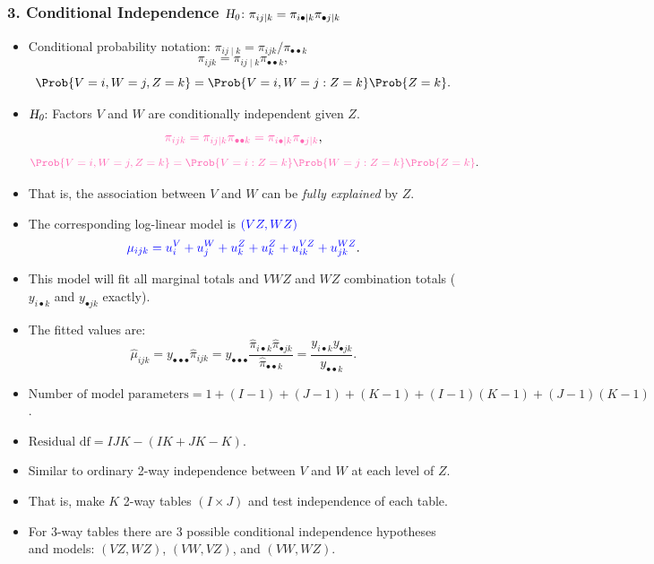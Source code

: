 \documentclass[oneside]{book}\usepackage[]{graphicx}\usepackage[svgnames]{xcolor}
\providecommand\given{} %
\renewcommand\given{\nonscript\:\delimsize\vert\nonscript\:\mathopen{}}%
\renewcommand\given{\nonscript\:\delimsize\vert\nonscript\:\mathopen{}}%
\renewcommand\given{\nonscript\:\delimsize\vert\nonscript\:\mathopen{}}%
\renewcommand\given{\nonscript\:\delimsize\vert\nonscript\:\mathopen{}}%
\renewcommand\given{\nonscript\:\delimsize\vert\nonscript\:\mathopen{}}%
\renewcommand\given{\nonscript\:\delimsize\vert\nonscript\:\mathopen{}}%
\renewcommand\given{\nonscript\:\delimsize\vert\nonscript\:\mathopen{}}%
\renewcommand\given{\nonscript\:\delimsize\vert\nonscript\:\mathopen{}}%
\renewcommand\given{\nonscript\:\delimsize\vert\nonscript\:\mathopen{}}%
\renewcommand\given{\nonscript\:\delimsize\vert\nonscript\:\mathopen{}}%
\renewcommand\given{\nonscript\:\delimsize\vert\nonscript\:\mathopen{}}%
\renewcommand\given{\nonscript\:\delimsize\vert\nonscript\:\mathopen{}}%
\let\log\relax%
\newcommand{\HN}{\textsl{H}_{\textsl{0}}}%
\renewcommand\given{:}
\begin{document}
\subsubsection*{3. Conditional Independence $ \HN\colon \pi_{ij\mid k}=\pi_{i\bullet\mid k}\pi_{\bullet j\mid k} $}
\begin{itemize}
      \item Conditional probability notation: $ \pi_{ij\mid k}=\pi_{ijk}/\pi_{\bullet\bullet k} $
            \[ \pi_{ijk}=\pi_{ij\mid k}\pi_{\bullet\bullet k}, \]
            \[ \Prob{V=i,W=j,Z=k}=\Prob{V=i,W=j\given Z=k}\Prob{Z=k}. \]
      \item $ \HN $: Factors $ V $ and $ W $ are conditionally independent given $ Z $.
            \[ \textcolor{HotPink}{
                        \pi_{ijk}=\pi_{ij\mid k}\pi_{\bullet\bullet k}=\pi_{i\bullet\mid k}\pi_{\bullet j\mid k}
                  }, \]
            \[ \textcolor{HotPink}{
                        \Prob{V=i,W=j,Z=k}=\Prob{V=i\given Z=k}\Prob{W=j\given Z=k}\Prob{Z=k}
                  }. \]
      \item That is, the association between $ V $ and $ W $ can be \emph{fully explained} by $ Z $.
      \item The corresponding log-linear model is $ \textcolor{Blue}{(VZ,WZ)} $
            \[ \textcolor{Blue}{\log{\mu}_{ijk}=u_i^V+u_j^W+u_k^Z+u_k^Z+u_{ik}^{VZ}+u_{jk}^{WZ}}. \]
      \item This model will fit all marginal totals and $ VWZ $ and $ WZ $ combination totals ($ y_{i\bullet k} $
            and $ y_{\bullet jk} $ exactly).
      \item The fitted values are:
            \[ \hat{\mu}_{ijk}=y_{\bullet\bullet\bullet}\hat{\pi}_{ijk}=y_{\bullet\bullet\bullet}\frac{\hat{\pi}_{i\bullet k}\hat{\pi}_{\bullet jk}}{\hat{\pi}_{\bullet\bullet k}}=\frac{y_{i\bullet k}y_{\bullet jk}}{y_{\bullet\bullet k}}. \]
      \item $ \text{Number of model parameters}=1 + (I - 1) + (J - 1) + (K - 1) + (I - 1)(K - 1) + (J - 1)(K - 1) $.
      \item $ \text{Residual df}=IJK - (IK + JK - K) $.
      \item Similar to ordinary 2-way independence between $V$ and $W$ at each level of $Z$.
      \item That is, make $K$ 2-way tables $ (I\times J) $ and test independence of each table.
      \item For 3-way tables there are 3 possible conditional independence hypotheses and
            models: $(VZ,WZ)$, $(VW,VZ)$, and $(VW,WZ)$.
\end{itemize}
\end{document}
